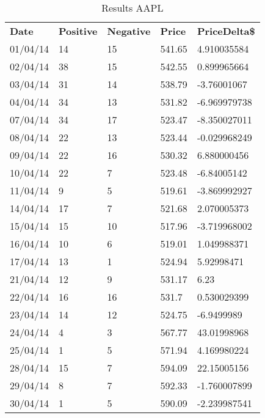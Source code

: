 \begin{table}\centering
	\caption{Results AAPL}\label{tab:ResultsApple}
   	\begin{tabular}{ | p{2cm\textwidth} | p{2cm\textwidth} | p{2cm\textwidth} | p{2cm\textwidth} | p{2.5cm\textwidth} |}
   	\hline

\textbf{Date}           & \textbf{Positive} & \textbf{Negative} & \textbf{Price}  & \textbf{PriceDelta\$} \\
01/04/14& 14       & 15       & 541.65 & 4.910035584  \\\hline
02/04/14& 38       & 15       & 542.55 & 0.899965664  \\\hline
03/04/14& 31       & 14       & 538.79 & -3.76001067  \\\hline
04/04/14& 34       & 13       & 531.82 & -6.969979738 \\\hline
07/04/14& 34       & 17       & 523.47 & -8.350027011 \\\hline
08/04/14& 22       & 13       & 523.44 & -0.029968249 \\\hline
09/04/14& 22       & 16       & 530.32 & 6.880000456  \\\hline
10/04/14& 22       & 7        & 523.48 & -6.84005142  \\\hline
11/04/14& 9        & 5        & 519.61 & -3.869992927 \\\hline
14/04/14& 17       & 7        & 521.68 & 2.070005373  \\\hline
15/04/14& 15       & 10       & 517.96 & -3.719968002 \\\hline
16/04/14& 10       & 6        & 519.01 & 1.049988371  \\\hline
17/04/14& 13       & 1        & 524.94 & 5.92998471   \\\hline
21/04/14& 12       & 9        & 531.17 & 6.23         \\\hline
22/04/14& 16       & 16       & 531.7  & 0.530029399  \\\hline
23/04/14& 14       & 12       & 524.75 & -6.9499989   \\\hline
24/04/14& 4        & 3        & 567.77 & 43.01998968  \\\hline
25/04/14& 1        & 5        & 571.94 & 4.169980224  \\\hline
28/04/14& 15       & 7        & 594.09 & 22.15005156  \\\hline
29/04/14& 8        & 7        & 592.33 & -1.760007899 \\\hline
30/04/14& 1        & 5        & 590.09 & -2.239987541 \\\hline

    \end{tabular}
\end{table}

